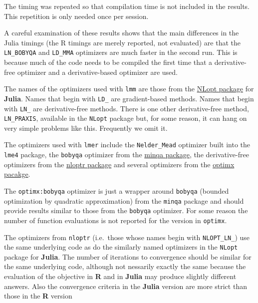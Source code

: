 \documentclass[article]{jss}
\begin{document}
    The timing was repeated so that compilation time is not included in the
results. This repetition is only needed once per session.

A careful examination of these results shows that the main differences
in the Julia timings (the R timings are merely reported, not evaluated)
are that the \texttt{LN\_BOBYQA} and \texttt{LD\_MMA} optimizers are
much faster in the second run. This is because much of the code needs to
be compiled the first time that a derivative-free optimizer and a
derivative-based optimizer are used.

The names of the optimizers used with \texttt{lmm} are those from the
\href{https://github.com/JuliaOpt/NLopt.jl}{NLopt package} for
\textbf{Julia}. Names that begin with \texttt{LD\_} are gradient-based
methods. Names that begin with \texttt{LN\_} are derivative-free
methods. There is one other derivative-free method, \texttt{LN\_PRAXIS},
available in the \texttt{NLopt} package but, for some reason, it can
hang on very simple problems like this. Frequently we omit it.

The optimizers used with \texttt{lmer} include the \texttt{Nelder\_Mead}
optimizer built into the \texttt{lme4} package, the \texttt{bobyqa}
optimizer from the
\href{http://cran.rstudio.com/web/packages/minqa/index.html}{minqa
package}, the derivative-free optimizers from the
\href{http://cran.rstudio.com/web/packages/nloptr/index.html}{nloptr
package} and several optimizers from the
\href{http://cran.rstudio.com/web/packages/optimx/index.html}{optimx
pacakge}.

The \texttt{optimx:bobyqa} optimizer is just a wrapper around
\texttt{bobyqa} (bounded optimization by quadratic approximation) from
the \texttt{minqa} package and should provide results similar to those
from the \texttt{bobyqa} optimizer. For some reason the number of
function evaluations is not reported for the version in \texttt{optimx}.

The optimizers from \texttt{nloptr} (i.e.~those whose names begin with
\texttt{NLOPT\_LN\_}) use the same underlying code as do the similarly
named optimizers in the \texttt{NLopt} package for \textbf{Julia}. The
number of iterations to convergence should be similar for the same
underlying code, although not nessarily exactly the same because the
evaluation of the objective in \textbf{R} and in \textbf{Julia} may
produce slightly different answers. Also the convergence criteria in the
\textbf{Julia} version are more strict than those in the \textbf{R}
version
\end{document}
